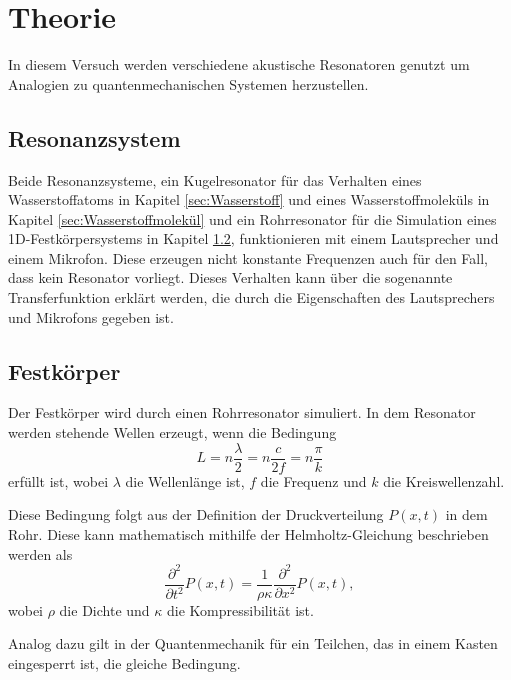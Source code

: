 \section{Theorie}
\label{sec:Theorie}

In diesem Versuch werden verschiedene akustische Resonatoren genutzt um Analogien zu quantenmechanischen Systemen herzustellen. 

\subsection{Resonanzsystem}

Beide Resonanzsysteme, ein Kugelresonator für das Verhalten eines Wasserstoffatoms in Kapitel \ref{sec:Wasserstoff} und eines Wasserstoffmoleküls in Kapitel \ref{sec:Wasserstoffmolekül}  und ein Rohrresonator für die Simulation eines 1D-Festkörpersystems in Kapitel \ref{sec:Festkörper}, funktionieren mit einem Lautsprecher und einem Mikrofon. Diese erzeugen nicht konstante Frequenzen auch für den Fall, dass kein Resonator vorliegt.
Dieses Verhalten kann über die sogenannte Transferfunktion erklärt werden, die durch die Eigenschaften des Lautsprechers und Mikrofons gegeben ist. 

\subsection{Festkörper}
\label{sec:Festkörper}
Der Festkörper wird durch einen Rohrresonator simuliert. In dem Resonator werden stehende Wellen erzeugt, wenn die Bedingung  
\begin{equation}
    L = n \frac{\lambda}{2} = n \frac{c}{2f} = n \frac{\pi}{k} 
    \label{eq:speed}
\end{equation}
erfüllt ist, wobei $\lambda$ die Wellenlänge ist, $f$ die Frequenz und $k$ die Kreiswellenzahl. 

Diese Bedingung folgt aus der Definition der Druckverteilung $P(x,t)$ in dem Rohr. Diese kann mathematisch mithilfe der Helmholtz-Gleichung beschrieben werden als 
\begin{equation*}
    \frac{\partial^2}{\partial t^2} P(x,t) = \frac{1}{\rho\kappa}\frac{\partial^2}{\partial x^2} P(x,t),
\end{equation*}
wobei $\rho$ die Dichte und $\kappa$ die Kompressibilität ist. 

Analog dazu gilt in der Quantenmechanik für ein Teilchen, das in einem Kasten eingesperrt ist, die gleiche Bedingung. 

